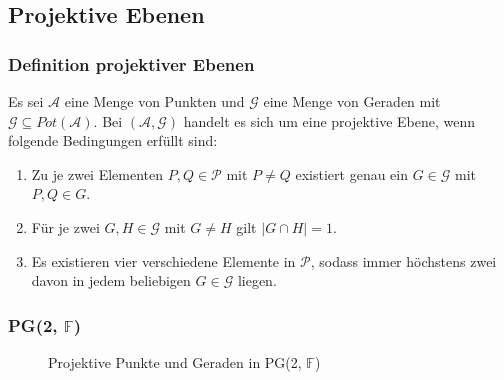 \documentclass{beamer}
\theoremstyle{plain}
\theoremstyle{definition}
\theoremstyle{rem}
\newcommand{\pgtwo}{PG(2, $\mathbb{F}$)\ }
\begin{document}
\subsection{Projektive Ebenen}
\begin{frame}
    \frametitle{Definition projektiver Ebenen}
    \begin{definition}
        Es sei $\mathcal{A}$ eine Menge von Punkten und $\mathcal{G}$ eine Menge von Geraden mit $\mathcal{G} \subseteq Pot(\mathcal{A})$.
        Bei $(\mathcal{A},\mathcal{G})$ handelt es sich um eine projektive Ebene, wenn folgende Bedingungen erfüllt sind:
	\begin{enumerate}[<+(1)->]
		\item Zu je zwei Elementen $P, Q\in \mathcal{P}$ mit $P\ne Q$ existiert genau ein $G\in\mathcal{G}$ mit $P, Q \in G$. \\
		\item Für je zwei $G,H\in\mathcal{G}$ mit $G\ne H$ gilt $|G\cap H|=1$.
		\item Es existieren vier verschiedene Elemente in $\mathcal{P}$, sodass immer höchstens zwei davon in jedem beliebigen $G\in\mathcal{G}$ liegen.
	\end{enumerate}
    \end{definition}
\end{frame}
\begin{frame}
    \frametitle{\pgtwo}
\pause
\begin{figure}[H]
\centering
{}
\caption{Projektive Punkte und Geraden in \pgtwo}
\end{figure}

\end{frame}
\end{document}
